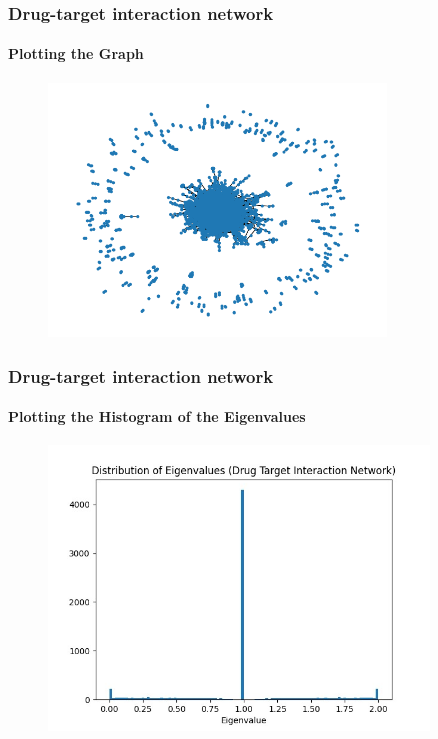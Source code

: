 \documentclass[aspectratio=43,leqno]{beamer}
\begin{document}
\begin{frame}
    \frametitle{Drug-target interaction network}
  \framesubtitle{Plotting the Graph}

 \begin{figure}[h]
    \centering
    \includegraphics[width=0.8\textwidth]{images/chg-graph.png}
    \label{fig:mesh1}
  \end{figure}
  
\end{frame}

\begin{frame}
    \frametitle{Drug-target interaction network}
  \framesubtitle{Plotting the Histogram of the Eigenvalues}

 \begin{figure}[h]
    \centering
    \includegraphics[width=0.9\textwidth]{images/chg-hist.jpeg}
    \label{fig:mesh1}
  \end{figure}
  
\end{frame}
\end{document}
